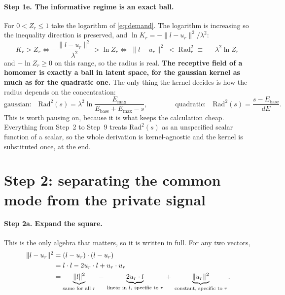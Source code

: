 \documentclass[11pt,a4paper]{article}
\newcommand{\Ebase}{E_{\mathrm{base}}}
\newcommand{\Emax}{E_{\mathrm{max}}}
\begin{document}
\paragraph{Step 1e. The informative regime is an exact ball.} For $0 < Z_r \le 1$ take
the logarithm of \eqref{eq:demand}. The logarithm is increasing so the inequality
direction is preserved, and $\ln K_r = -\|l-u_r\|^2/\lambda^2$:
\begin{equation}
  K_r > Z_r
  \iff -\frac{\|l-u_r\|^2}{\lambda^2} > \ln Z_r
  \iff \boxed{\;\|l - u_r\|^2 \;<\; \mathrm{Rad}_r^2 \;\equiv\; -\lambda^2 \ln Z_r \;}
  \label{eq:ball}
\end{equation}
and $-\ln Z_r \ge 0$ on this range, so the radius is real. \textbf{The receptive field of
a homomer is exactly a ball in latent space, for the gaussian kernel as much as for the
quadratic one.} The only thing the kernel decides is how the radius depends on the
concentration:
\begin{equation}
  \text{gaussian:}\quad \mathrm{Rad}^2(s) = \lambda^2 \ln\!\frac{\Emax}{\Ebase+\Emax-s},
  \qquad\qquad
  \text{quadratic:}\quad \mathrm{Rad}^2(s) = \frac{s - \Ebase}{dE}.
  \label{eq:radtwo}
\end{equation}
This is worth pausing on, because it is what keeps the calculation cheap. Everything
from Step~2 to Step~9 treats $\mathrm{Rad}^2(s)$ as an unspecified scalar function of a
scalar, so the whole derivation is kernel-agnostic and the kernel is substituted once,
at the end.

\section{Step 2: separating the common mode from the private signal}
\label{sec:step2}

\paragraph{Step 2a. Expand the square.} This is the only algebra that matters, so it is
written in full. For any two vectors,
\begin{align}
  \|l-u_r\|^2
   &= (l-u_r)\cdot(l-u_r) \notag\\
   &= l\cdot l - 2u_r\cdot l + u_r\cdot u_r \notag\\
   &= \underbrace{\|l\|^2}_{\text{same for all } r}
    \;-\; \underbrace{2u_r\cdot l}_{\text{linear in } l,\ \text{specific to } r}
    \;+\; \underbrace{\|u_r\|^2}_{\text{constant, specific to } r}.
  \label{eq:expand}
\end{align}
\end{document}
